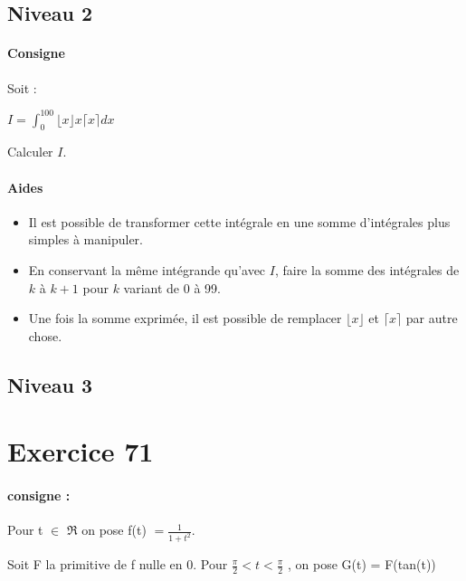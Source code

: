 \documentclass[a4paper]{report}
\begin{document}
			\subsection{Niveau 2}
				\begin{tcolorbox}[colback=white,colframe=black,title=Exercice - Intégrales et arrondis]
					\paragraph{Consigne}
						Soit :
						\begin{center}
							$I = \int_{0}^{100}\lfloor x \rfloor x \lceil x \rceil dx$
						\end{center}
						Calculer $I$.
						
					\tcblower					
					
					\paragraph{Aides}
						\begin{itemize}
							\item Il est possible de transformer cette intégrale en une somme d'intégrales plus simples à manipuler.
							\item En conservant la même intégrande qu'avec $I$, faire la somme des intégrales de $k$ à $k+1$ pour $k$ variant de 0 à 99.	
							\item Une fois la somme exprimée, il est possible de remplacer $\lfloor x \rfloor$ et $\lceil x \rceil$ par autre chose.			
						\end{itemize}	
				\end{tcolorbox}											
		
			\subsection{Niveau 3}
   \section{Exercice 71}
\paragraph{consigne :}
Pour t $\in$ $\Re$ on pose f(t) $=\frac{1}{1+t^2}$.
\begin{center}
    Soit F la primitive de f nulle en 0. Pour $\frac{\pi}{2} < t <  \frac{\pi}{2}$ , on pose G(t) = F(tan(t)) 
\end{center}
\end{document}
